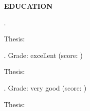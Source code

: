 %
%
%
%
%



\begin{center}
    \textbf{EDUCATION}
\end{center}
\textbf{\PhDUniversity} \hfill \PhDLocation

\PhDFaculty \hfill \PhDDate

\textbf{\PhDTitle}.

Thesis: \PhDThesis

\PhDGrant

\vspace{\spaceSection}

\textbf{\MScUniversity} \hfill \MScLocation

\MScFaculty \hfill	\MScDate

\textbf{\MScTitle}. Grade: excellent (score: \MScScore)

Thesis: \MScThesis

\MScNotes

\vspace{\spaceSection}

\textbf{\BScUniversity} \hfill \BScLocation

\BScFaculty \hfill \BScDate

\textbf{\BScTitle}. Grade: very good (score: \BScScore)

Thesis: \BScThesis